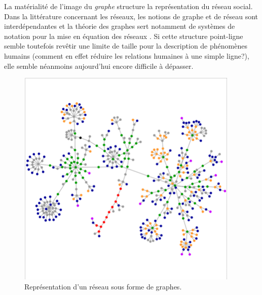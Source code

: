 La matérialité de l{\textquoteright}image du \textit{graphe} structure la représentation du réseau social. Dans la littérature concernant les réseaux, les notions de graphe et de réseau sont interdépendantes et la théorie des graphes sert notamment de systèmes de notation pour la mise en équation des réseaux \citep{Nettleton2013}. Si cette structure point-ligne semble toutefois rev\^etir une limite de taille pour la description de phénomènes humains (comment en effet réduire les relations humaines à une simple ligne?), elle semble néanmoins aujourd{\textquoteright}hui encore difficile à dépasser.

\begin{figure}
    \centering
    \includegraphics[width=4.178in,height=4.1449in]{figures/chap3/chapitre3-img2.png}
    \caption{Représentation d'un réseau sous forme de graphes.}
\end{figure}



